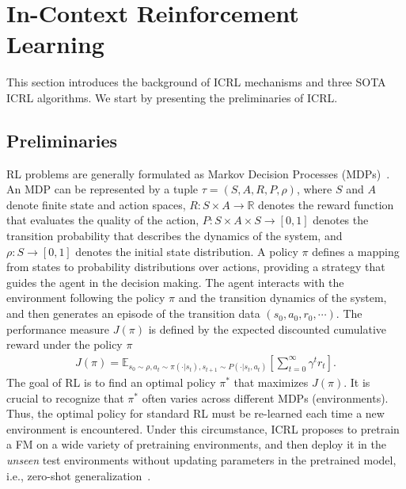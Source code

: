 \documentclass[10pt]{article}
\def\Real{\mathbb{R}}
\def\mbE{{\ensuremath{\mathbb E}}}
\begin{document}
\section{In-Context Reinforcement Learning}
This section introduces the background of ICRL mechanisms and three SOTA ICRL algorithms. We start by presenting the preliminaries of ICRL.
\subsection{Preliminaries}
RL problems are generally formulated as Markov Decision Processes (MDPs)~\citep{sutton2018reinforcement}.
An MDP can be represented by a tuple $\tau = (S, A, R, P, \rho)$, where $S$ and $A$ denote finite state and action spaces, $R: S \times A \to \Real$ denotes the reward function that evaluates the quality of the action, $P: S \times A \times S \to [0, 1]$ denotes the transition probability that describes the dynamics of the system, and $\rho: S \to [0, 1]$ denotes the initial state distribution.
A policy $\pi$ defines a mapping from states to probability distributions over actions, providing a strategy that guides the agent in the decision making.
The agent interacts with the environment following the policy $\pi$ and the transition dynamics of the system, and then generates an episode of the transition data $(s_0, a_0, r_0, \cdots)$.
The performance measure $J (\pi)$ is defined by the expected discounted cumulative reward under the policy $\pi$
\begin{align}
    J (\pi) = \mbE_{s_0 \sim \rho, a_t \sim \pi(\cdot | s_t), s_{t+1} \sim P(\cdot|s_t, a_t)} \left[ \sum_{t=0}^\infty \gamma^t r_t \right].
\end{align}
The goal of RL is to find an optimal policy $\pi^*$ that maximizes $J (\pi)$.
It is crucial to recognize that $\pi^*$ often varies across different MDPs (environments). Thus, the optimal policy for standard RL must be re-learned each time a new environment is encountered.
Under this circumstance, ICRL proposes to pretrain a FM on a wide variety of pretraining environments, and then deploy it in the \textit{unseen} test environments without updating parameters in the pretrained model, i.e., zero-shot generalization~\citep{sohn2018hierarchical, mazoure2022improving, zisselman2023explore, kirk2023survey}.
\end{document}
